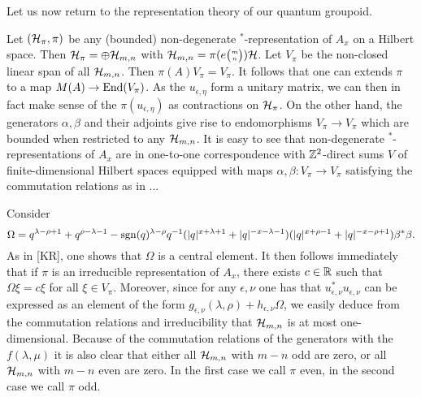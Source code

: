 Let us now return to the representation theory of our quantum groupoid.

Let $(\mathcal{H}_{\pi},\pi)$ be any (bounded) non-degenerate $^*$-representation of $A_x$ on a Hilbert space. Then $\mathcal{H}_{\pi} = \oplus \mathcal{H}_{m,n}$ with $\mathcal{H}_{m,n} = \pi(e{{\tiny \begin{pmatrix}m\\ n\end{pmatrix}}})\mathcal{H}$. Let $V_{\pi}$ be the non-closed linear span of all $\mathcal{H}_{m,n}$. Then $\pi(A)V_{\pi} = V_{\pi}$. It follows that one can extends $\pi$ to a map $M(A) \rightarrow \operatorname{\mathrm{End}}(V_{\pi})$. As the $u_{\epsilon,\eta}$ form a unitary matrix, we can then in fact make sense of the $\pi(u_{\epsilon,\eta})$ as contractions on $\mathcal{H}_{\pi}$. On the other hand, the generators $\alpha,\beta$ and their adjoints give rise to endomorphisms $V_{\pi}\rightarrow V_{\pi}$ which are bounded when restricted to any $\mathcal{H}_{m,n}$. It is easy to see that non-degenerate $^*$-representations of $A_x$ are in one-to-one correspondence with $\mathbb{Z}^2$-direct sums $V$ of finite-dimensional Hilbert spaces equipped with maps $\alpha,\beta:V_{\pi}\rightarrow V_{\pi}$ satisfying the commutation relations as in ...

Consider \[\Omega =q^{\lambda-\rho+1}+q^{\rho-\lambda-1} - \operatorname{\mathrm{sgn}}(q)^{\lambda-\rho}q^{-1}(|q|^{x+\lambda+1}+|q|^{-x-\lambda-1})(|q|^{x+\rho-1}+|q|^{-x-\rho+1})\beta^*\beta.\] As in [KR], one shows that $\Omega$ is a central element. It then follows immediately that if $\pi$ is an irreducible representation of $A_x$, there exists $c\in \mathbb{R}$ such that $\Omega\xi = c\xi$ for all $\xi \in V_{\pi}$. Moreover, since for any $\epsilon,\nu$ one has that $u_{\epsilon,\nu}^*u_{\epsilon,\nu}$ can be expressed as an element of the form $g_{\epsilon,\nu}(\lambda,\rho) + h_{\epsilon,\nu}\Omega$, we easily deduce from the commutation relations and irreducibility that $\mathcal{H}_{m,n}$ is at most one-dimensional. Because of the commutation relations of the generators with the $f(\lambda,\mu)$ it is also clear that either all $\mathcal{H}_{m,n}$ with $m-n$ odd are zero, or all $\mathcal{H}_{m,n}$ with $m-n$ even are zero. In the first case we call $\pi$ even, in the second case we call $\pi$ odd. 


